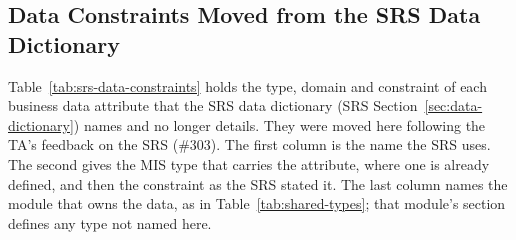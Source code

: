 \documentclass[12pt, titlepage]{article}
\begin{document}
\subsection{Data Constraints Moved from the SRS Data Dictionary}
\label{sec:srs-data-constraints}

Table~\ref{tab:srs-data-constraints} holds the type, domain and constraint of
each business data attribute that the SRS data dictionary (SRS
Section~\ref{sec:data-dictionary}) names and no longer details. They were moved
here following the TA's feedback on the SRS (\#303). The first column is the
name the SRS uses. The second gives the MIS type that carries the attribute,
where one is already defined, and then the constraint as the SRS stated it. The
last column names the module that owns the data, as in
Table~\ref{tab:shared-types}; that module's section defines any type not named
here.
\end{document}
